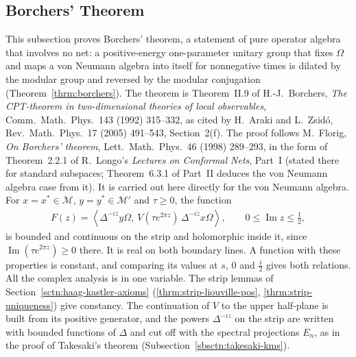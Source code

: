 \subsection{Borchers' Theorem}\label{sbsctn:borchers-theorem}

This subsection proves Borchers' theorem, a statement of pure operator algebra that involves no net: a positive-energy one-parameter unitary group that fixes $\Omega$ and maps a von Neumann algebra into itself for nonnegative times is dilated by the modular group and reversed by the modular conjugation (Theorem~\ref{thrm:borchers}). The theorem is Theorem~II.9 of H.-J.~Borchers, \emph{The CPT-theorem in two-dimensional theories of local observables}, Comm.\ Math.\ Phys.\ 143 (1992) 315--332, as cited by H.~Araki and L.~Zsid\'o, Rev.\ Math.\ Phys.\ 17 (2005) 491--543, Section~2(f). The proof follows M.~Florig, \emph{On Borchers' theorem}, Lett.\ Math.\ Phys.\ 46 (1998) 289--293, in the form of Theorem~2.2.1 of R.~Longo's \emph{Lectures on Conformal Nets}, Part~I (stated there for standard subspaces; Theorem~6.3.1 of Part~II deduces the von Neumann algebra case from it). It is carried out here directly for the von Neumann algebra. For $x = x^* \in \mathcal{M}$, $y = y^* \in \mathcal{M}'$ and $\tau \ge 0$, the function
\begin{align}
    F(z) = \left< \Delta^{-i\overline{z}}y\Omega, \ V(\tau e^{2\pi z})\,\Delta^{-iz}x\Omega \right>, \qquad 0 \le \operatorname{Im} z \le \tfrac{1}{2},
\end{align}
is bounded and continuous on the strip and holomorphic inside it, since $\operatorname{Im}(\tau e^{2\pi z}) \ge 0$ there. It is real on both boundary lines. A function with these properties is constant, and comparing its values at $s$, $0$ and $\tfrac{i}{2}$ gives both relations. All the complex analysis is in one variable. The strip lemmas of Section~\ref{sctn:haag-kastler-axioms} (\ref{thrm:strip-liouville-pos}, \ref{thrm:strip-uniqueness}) give constancy. The continuation of $V$ to the upper half-plane is built from its positive generator, and the powers $\Delta^{-iz}$ on the strip are written with bounded functions of $\Delta$ and cut off with the spectral projections $E_n$, as in the proof of Takesaki's theorem (Subsection~\ref{sbsctn:takesaki-kms}).

